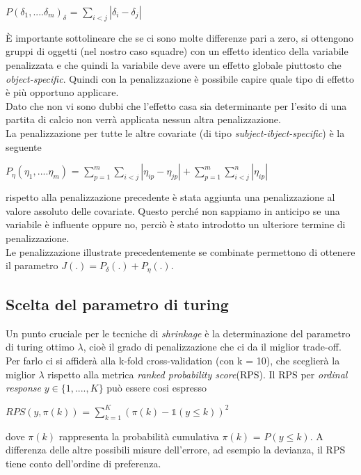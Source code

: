 \begin{center}
	$ P(\delta_1,....\delta_m)_{\delta}$ = $\sum_{i<j}|\delta_i - \delta_j|$ 
\end{center}

È importante sottolineare che se ci sono molte differenze pari a zero, si ottengono gruppi di oggetti (nel nostro caso squadre) con un effetto identico della variabile penalizzata e che quindi la variabile deve avere un effetto globale piuttosto che \emph{object-specific}. Quindi con la penalizzazione è possibile capire quale tipo di effetto è più opportuno applicare.\\
Dato che non vi sono dubbi che l'effetto casa sia determinante per l'esito di una partita di calcio non verrà applicata nessun altra penalizzazione.\\
La penalizzazione per tutte le altre covariate (di tipo \emph{subject-ibject-specific}) è la seguente 
\begin{center}
	$ P_{\eta}(\eta_1,....\eta_m)$ = $\sum^{m}_{p=1}\sum_{i<j}|\eta_{ip} - \eta_{jp}| + \sum^{m}_{p=1}\sum^{n}_{i<j}|\eta_{ip}|$
\end{center}

rispetto alla penalizzazione precedente è stata aggiunta una penalizzazione al valore assoluto delle covariate. Questo perché non sappiamo in anticipo se una variabile è influente oppure no, perciò è stato introdotto un ulteriore termine di penalizzazione.\\

Le penalizzazione illustrate precedentemente se combinate permettono di ottenere il parametro $J(.) = P_\delta(.) + P_\eta(.)$.
\subsection{Scelta del parametro di turing}
Un punto cruciale per le tecniche di \emph{shrinkage} è la determinazione del parametro di turing ottimo $\lambda$, cioè il grado di penalizzazione che ci da il miglior trade-off. Per farlo ci si affiderà alla k-fold cross-validation (con k = 10), che sceglierà la miglior $\lambda$ rispetto alla metrica \emph{ranked probability score}(RPS).
Il RPS per \emph{ordinal response} $y \in \{1,....,K\}$ \autocite{GneitingRaftery2007} può essere cosi espresso 
\begin{center}
	$ RPS(y,\pi(k))$ = $\sum^{K}_{k = 1}(\pi(k) - \mathbb{1}(y \le k))^2$ 
\end{center}
dove $\pi(k)$ rappresenta la probabilità cumulativa $\pi(k)$ = $P(y \le k)$. A differenza delle altre possibili misure dell'errore, ad esempio la devianza, il RPS tiene conto dell'ordine di preferenza.


